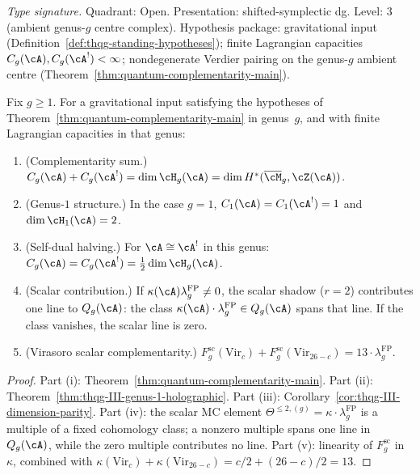 \begin{theorem}
\label{thm:thqg-lagrangian-constraint}
\textit{Type signature.}
Quadrant: Open. Presentation: shifted-symplectic dg.
Level: $3$ (ambient genus-$g$ centre complex).
Hypothesis package: gravitational input
\textup{(}Definition~\ref{def:thqg-standing-hypotheses}\textup{)};
finite Lagrangian capacities $C_g(\cA), C_g(\cA^!) < \infty$;
nondegenerate Verdier pairing on the genus-$g$ ambient centre
\textup{(}Theorem~\ref{thm:quantum-complementarity-main}\textup{)}.

\medskip
Fix $g\ge1$.  For a gravitational input satisfying the hypotheses of
Theorem~\ref{thm:quantum-complementarity-main} in genus~$g$, and with
finite Lagrangian capacities in that genus:
\begin{enumerate}[label=\textup{(\roman*)}]
\item \textup{(Complementarity sum.)}
 $C_g(\cA) + C_g(\cA^!) = \dim \cH_g(\cA)
 = \dim H^*(\overline{\cM}_g, \cZ(\cA))$.

\item \textup{(Genus-$1$ structure.)}
 In the case $g=1$,
 $C_1(\cA) = C_1(\cA^!) = 1$ and $\dim \cH_1(\cA) = 2$.

\item \textup{(Self-dual halving.)}
 For $\cA \cong \cA^!$ in this genus:
 $C_g(\cA) = C_g(\cA^!)
 = \tfrac{1}{2}\dim \cH_g(\cA)$.

\item \textup{(Scalar contribution.)}
 If $\kappa(\cA)\lambda_g^{\mathrm{FP}}\neq0$, the scalar shadow
 ($r = 2$) contributes one line to $Q_g(\cA)$: the class
 $\kappa(\cA) \cdot \lambda_g^{\mathrm{FP}} \in Q_g(\cA)$
 spans that line.  If the class vanishes, the scalar line is zero.

\item \textup{(Virasoro scalar complementarity.)}
 $F_g^{\mathrm{sc}}(\mathrm{Vir}_c) + F_g^{\mathrm{sc}}(\mathrm{Vir}_{26-c})
 = 13 \cdot \lambda_g^{\mathrm{FP}}$.
\end{enumerate}
\end{theorem}

\begin{proof}
Part (i): Theorem~\ref{thm:quantum-complementarity-main}.
Part (ii): Theorem~\ref{thm:thqg-III-genus-1-holographic}.
Part (iii): Corollary~\ref{cor:thqg-III-dimension-parity}.
Part (iv): the scalar MC element
$\Theta^{\le 2,(g)} = \kappa \cdot \lambda_g^{\mathrm{FP}}$
is a multiple of a fixed cohomology class; a nonzero multiple spans
one line in $Q_g(\cA)$, while the zero multiple contributes no line.
Part (v): linearity of $F_g^{\mathrm{sc}}$ in $\kappa$,
combined with $\kappa(\mathrm{Vir}_c) + \kappa(\mathrm{Vir}_{26-c})
= c/2 + (26-c)/2 = 13$.
\end{proof}

